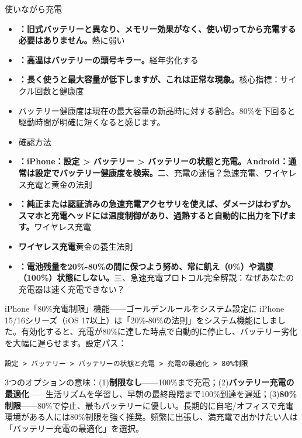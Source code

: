 


使いながら充電

\begin{itemize}
  \item \textbf{：旧式バッテリーと異なり、メモリー効果がなく、使い切ってから充電する必要はありません。}熱に弱い
  \item \textbf{：高温はバッテリーの頭号キラー。}経年劣化する
  \item \textbf{：長く使うと最大容量が低下しますが、これは正常な現象。}核心指標：サイクル回数と健康度
\end{itemize}


\begin{itemize}
  \item バッテリー健康度は現在の最大容量の新品時に対する割合。80\%を下回ると駆動時間が明確に短くなると感じます。
  \item 確認方法
  \item \textbf{：iPhone：設定 > バッテリー > バッテリーの状態と充電。Android：通常は設定でバッテリー健康度を検索。}二、充電の迷信？急速充電、ワイヤレス充電と黄金の法則
\end{itemize}


\begin{itemize}
  \item \textbf{：純正または認証済みの急速充電アクセサリを使えば、ダメージはわずか。スマホと充電ヘッドには温度制御があり、過熱すると自動的に出力を下げます。}ワイヤレス充電
  \item \textbf{ワイヤレス充電}黄金の養生法則
  \item \textbf{：電池残量を20\%-80\%の間に保つよう努め、常に飢え（0\%）や満腹（100\%）状態にしない。}三、急速充電プロトコル完全解説：なぜあなたの充電器は速く充電できない？
\end{itemize}

\begin{tcbinfo}{iPhone「80\%充電制限」機能——ゴールデンルールをシステム設定に}
iPhone 15/16シリーズ（iOS 17以上）は「20\%-80\%の法則」をシステム機能にしました。有効化すると、充電が80\%に達した時点で自動的に停止し、バッテリー劣化を大幅に遅らせます。設定パス：

\texttt{設定 > バッテリー > バッテリーの状態と充電 > 充電の最適化 > 80\%制限}

3つのオプションの意味：(1)\textbf{制限なし}——100\%まで充電；(2)\textbf{バッテリー充電の最適化}——生活リズムを学習し、早朝の最終段階まで100\%到達を遅延；(3)\textbf{80\%制限}——80\%で停止、最もバッテリーに優しい。長期的に自宅/オフィスで充電環境がある人には80\%制限を強く推奨。頻繁に出張し、満充電で出かけたい人は「バッテリー充電の最適化」を選択。

\end{tcbinfo}

